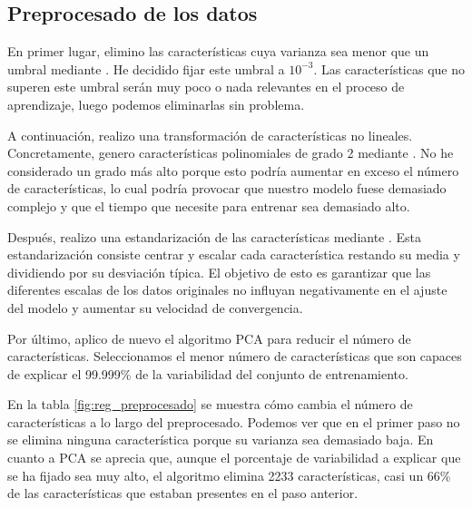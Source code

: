 \documentclass[10pt,a4paper]{article}
\begin{document}
\subsection{Preprocesado de los datos}

En primer lugar, elimino las características cuya varianza sea menor que un umbral mediante . He decidido fijar este umbral a $10^{-3}$. Las características que no superen este umbral serán muy poco o nada relevantes en el proceso de aprendizaje, luego podemos eliminarlas sin problema.

A continuación, realizo una transformación de características no lineales. Concretamente, genero características polinomiales de grado 2 mediante . No he considerado un grado más alto porque esto podría aumentar en exceso el número de características, lo cual podría provocar que nuestro modelo fuese demasiado complejo y que el tiempo que necesite para entrenar sea demasiado alto.

Después, realizo una estandarización de las características mediante . Esta estandarización consiste centrar y escalar cada característica restando su media y dividiendo por su desviación típica. El objetivo de esto es garantizar que las diferentes escalas de los datos originales no influyan negativamente en el ajuste del modelo y aumentar su velocidad de convergencia.

Por último, aplico de nuevo el algoritmo PCA para reducir el número de características. Seleccionamos el menor número de características que son capaces de explicar el 99.999\% de la variabilidad del conjunto de entrenamiento.

En la tabla \ref{fig:reg_preprocesado} se muestra cómo cambia el número de características a lo largo del preprocesado. Podemos ver que en el primer paso no se elimina ninguna característica porque su varianza sea demasiado baja. En cuanto a PCA se aprecia que, aunque el porcentaje de variabilidad a explicar que se ha fijado sea muy alto, el algoritmo elimina 2233 características, casi un 66\% de las características que estaban presentes en el paso anterior.
\end{document}
